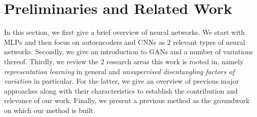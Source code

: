 \documentclass[a4paper,12pt]{report}
\begin{document}
\chapter{Preliminaries and Related Work}\label{sec:related_work}
In this section, we first give a brief overview of neural networks. We start with MLPs and then focus on autoencoders and CNNs as 2 relevant types of neural networks. Secondly, we give an introduction to GANs and a number of variations thereof. Thirdly, we review the 2 research areas this work is rooted in, namely \textit{representation learning} in general and \textit{unsupervised disentangling factors of variation} in particular. For the latter, we give an overview of previous major approaches along with their characteristics to establish the contribution and relevance of our work. Finally, we present a previous method as the groundwork on which our method is built.
\end{document}
